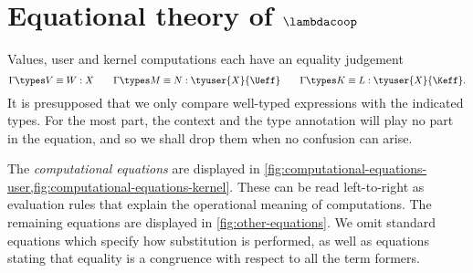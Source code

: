 
\section{Equational theory of $\lambdacoop$}
\label{sec:appendix-equational-rules}

Values, user and kernel computations each have an equality judgement
\begin{equation*}
\Gamma \types V \equiv W : X
\qquad
\Gamma \types M \equiv N : \tyuser{X}{\Ueff}
\qquad
\Gamma \types K \equiv L  : \tyuser{X}{\Keff}.
\end{equation*}
%
It is presupposed that we only compare well-typed expressions with the indicated types.
For the most part, the context and the type annotation will play no part in the equation,
and so we shall drop them when no confusion can arise.

The \emph{computational equations} are displayed in \cref{fig:computational-equations-user,fig:computational-equations-kernel}.
These can be read left-to-right as evaluation rules that explain the operational meaning
of computations. The remaining equations are displayed in \cref{fig:other-equations}.
%
We omit standard equations which specify how substitution is performed, as well
as equations stating that equality is a congruence with respect to all the term
formers.


